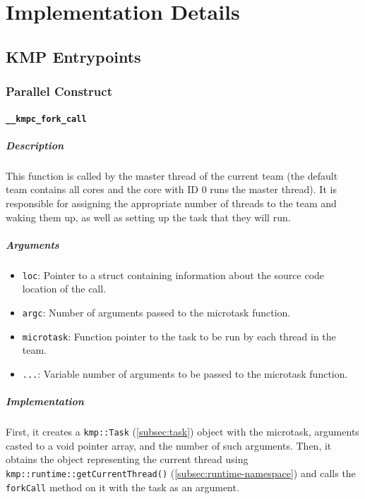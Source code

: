 \chapter{Implementation Details}

\section{KMP Entrypoints}
\label{sec:kmp-entrypoints}

\subsection{Parallel Construct}
\label{subsec:parallel-construct}

\subsubsection{\texttt{\_\_kmpc\_fork\_call}}
\label{subsubsec:kmpc-fork-call}

\paragraph{Description} This function is called by the master thread of the current team (the
default team contains all cores and the core with ID 0 runs the master thread). It is responsible
for assigning the appropriate number of threads to the team and waking them up, as well as setting
up the task that they will run.

\paragraph{Arguments}
\begin{itemize}
	\item \texttt{loc}: Pointer to a struct containing information about the source code location
	      of the call.
	\item \texttt{argc}: Number of arguments passed to the microtask function.
	\item \texttt{microtask}: Function pointer to the task to be run by each thread in the team.
	\item \texttt{...}: Variable number of arguments to be passed to the microtask function.
\end{itemize}

\paragraph{Implementation} First, it creates a \texttt{kmp::Task} (\cref{subsec:task}) object with
the microtask, arguments casted to a void pointer array, and the number of such arguments. Then, it
obtains the object representing the current thread using \texttt{kmp::runtime::getCurrentThread()}
(\cref{subsec:runtime-namespace}) and calls the \texttt{forkCall} method on it with the task as an
argument.

